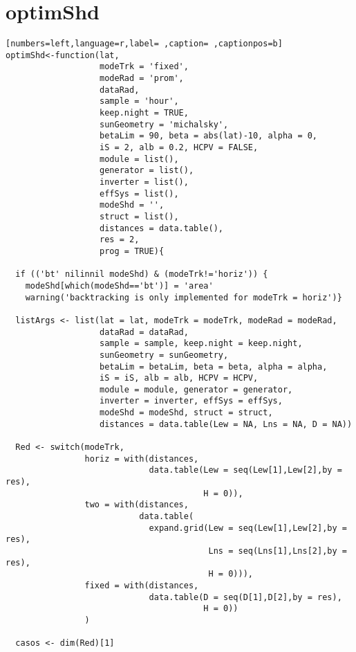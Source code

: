 \section{optimShd}
\label{sec:orgefd2d1d}
\begin{lstlisting}[numbers=left,language=r,label= ,caption= ,captionpos=b]
optimShd<-function(lat,
                   modeTrk = 'fixed', 
                   modeRad = 'prom', 
                   dataRad,
                   sample = 'hour',
                   keep.night = TRUE,
                   sunGeometry = 'michalsky',
                   betaLim = 90, beta = abs(lat)-10, alpha = 0,
                   iS = 2, alb = 0.2, HCPV = FALSE,
                   module = list(), 
                   generator = list(),
                   inverter = list(), 
                   effSys = list(), 
                   modeShd = '',    
                   struct = list(), 
                   distances = data.table(),
                   res = 2,      
                   prog = TRUE){ 

  if (('bt' nilinnil modeShd) & (modeTrk!='horiz')) {
    modeShd[which(modeShd=='bt')] = 'area'
    warning('backtracking is only implemented for modeTrk = horiz')}

  listArgs <- list(lat = lat, modeTrk = modeTrk, modeRad = modeRad,
                   dataRad = dataRad,
                   sample = sample, keep.night = keep.night,
                   sunGeometry = sunGeometry,
                   betaLim = betaLim, beta = beta, alpha = alpha,
                   iS = iS, alb = alb, HCPV = HCPV,
                   module = module, generator = generator,
                   inverter = inverter, effSys = effSys,
                   modeShd = modeShd, struct = struct,
                   distances = data.table(Lew = NA, Lns = NA, D = NA))

  Red <- switch(modeTrk,
                horiz = with(distances,
                             data.table(Lew = seq(Lew[1],Lew[2],by = res),
                                        H = 0)),
                two = with(distances,
                           data.table(
                             expand.grid(Lew = seq(Lew[1],Lew[2],by = res),
                                         Lns = seq(Lns[1],Lns[2],by = res),
                                         H = 0))),
                fixed = with(distances,
                             data.table(D = seq(D[1],D[2],by = res),
                                        H = 0))
                )

  casos <- dim(Red)[1]


\end{lstlisting}
